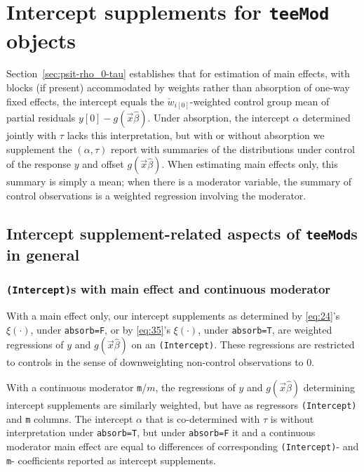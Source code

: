 \documentclass{article}
\newcommand{\owt}[1][{[z_{i}]}]{\ensuremath{\check{w}_{i#1}}}
\begin{document}
\section{Intercept supplements for \texttt{teeMod} objects}%
\label{sec:repl-interc-textttt} 
Section~\ref{sec:psit-rho_0-tau} establishes that for estimation of
main effects, with blocks (if present) accommodated by weights rather than
absorption of one-way fixed effects, the intercept equals the
$\owt[{[0]}]$-weighted control group mean of partial residuals
$y[0] - g(\vec{x}\hat\beta)$. Under absorption, the intercept $\alpha$ determined jointly with $\tau$ lacks this interpretation, but with or without absorption we supplement the $(\alpha, \tau)$ report with summaries of the distributions under control of the response $y$ and offset $g(\vec{x}\hat\beta)$.  When estimating main effects only, this summary is simply a mean; when there is a moderator variable, the summary of control observations is a weighted regression involving the moderator. 
\subsection{Intercept supplement-related aspects of  \texttt{teeMod}s in general}%
\label{sec:interc-aspects-gen-teeMods}
\subsubsection{\texttt{(Intercept)}s with main effect and continuous
  moderator}
With a main effect only, our intercept supplements as determined by \eqref{eq:24}'s $\xi(\cdot)$, under \texttt{absorb=F}, or by \eqref{eq:35}'s $\xi(\cdot)$, under \texttt{absorb=T}, are weighted regressions of $y$ and $g(\vec{x}\hat\beta)$ on an \texttt{(Intercept)}.  These regressions are restricted to controls in the sense of downweighting non-control observations to 0. 

With a continuous moderator \texttt{m}/$m$, the regressions of $y$ and $g(\vec{x}\hat\beta)$ determining intercept supplements are similarly weighted, but have as regressors \texttt{(Intercept)} and \texttt{m} columns.  The intercept $\alpha$ that is co-determined with $\tau$ is without interpretation under \texttt{absorb=T}, but under \texttt{absorb=F} it and a continuous moderator main effect are equal to differences of corresponding \texttt{(Intercept)}- and \texttt{m}- coefficients reported as intercept supplements. 
\end{document}

